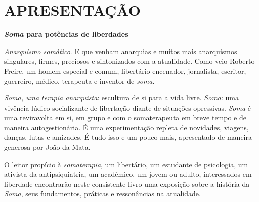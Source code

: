 



\chapter{APRESENTAÇÃO}

\textbf{\emph{Soma} para potências de liberdades}

\emph{Anarquismo somático}. E que venham anarquias e muitos mais
anarquismos singulares, firmes, preciosos e sintonizados com a
atualidade. Como veio Roberto Freire, um homem especial e comum,
libertário encenador, jornalista, escritor, guerreiro, médico, terapeuta
e inventor de \emph{soma}.

\emph{Soma, uma terapia anarquista}: escultura de si para a vida livre.
\emph{Soma}: uma vivência lúdico-socializante de libertação diante de
situações opressivas. \emph{Soma} é uma reviravolta em si, em grupo e
com o somaterapeuta em breve tempo e de maneira autogestionária. É uma
experimentação repleta de novidades, viagens, danças, lutas e amizades.
É tudo isso e um pouco mais, apresentado de maneira generosa por João da
Mata.

O leitor propício à \emph{somaterapia}, um libertário, um estudante de
psicologia, um ativista da antipsiquiatria, um acadêmico, um jovem ou
adulto, interessados em liberdade encontrarão neste consistente livro
uma exposição sobre a história da \emph{Soma}, seus fundamentos,
práticas e ressonâncias na atualidade.

